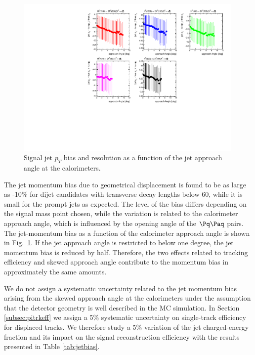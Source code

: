 \begin{figure}[htbp]
\centering
\includegraphics[width=0.99\textwidth]{plots/signal/biasapproachAngle.pdf}
\caption{Signal jet $p_T$ bias and resolution as a function of the jet approach angle at the calorimeters.\label{fig:jetbiasAngle}}
\end{figure} 

The jet momentum bias due to geometrical displacement is found to be as large as -10\% for dijet candidates with transverse
decay lengths below 60\cm, while it is small for the prompt jets as expected. The level of the bias differs
depending on the signal mass point chosen, while the variation is related to the calorimeter approach angle,
which is influenced by the opening angle of the $\qq$ pairs.
The jet-momentum bias as a function of the calorimeter approach angle is shown in Fig.~\ref{fig:jetbiasAngle}.
If the jet approach angle is restricted to below one degree, the jet momentum bias is reduced by half.
 Therefore, the two effects related to tracking efficiency and skewed approach angle contribute to the 
momentum bias in approximately the same amounts.

We do not assign a systematic uncertainty related to the jet momentum bias arising from the skewed approach angle 
at the calorimeters under the assumption that the detector geometry is well described in the MC simulation.
In Section \ref{subsec:pitrkeff} we assign a 5\% systematic uncertainty on single-track efficiency for 
displaced tracks. We therefore study a 5\% variation of the jet charged-energy
fraction and its impact on the signal reconstruction efficiency with the results presented 
in Table \ref{tab:jetbias}. 

